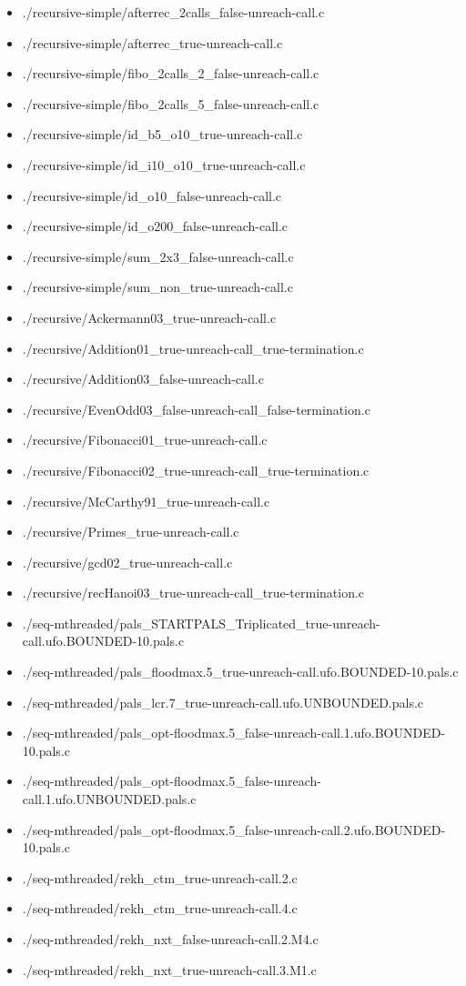 \documentclass[envcountsame]{llncs}
\begin{document}
\begin{itemize}
\item ./recursive-simple/afterrec\_2calls\_false-unreach-call.c
\item ./recursive-simple/afterrec\_true-unreach-call.c
\item ./recursive-simple/fibo\_2calls\_2\_false-unreach-call.c
\item ./recursive-simple/fibo\_2calls\_5\_false-unreach-call.c
\item ./recursive-simple/id\_b5\_o10\_true-unreach-call.c
\item ./recursive-simple/id\_i10\_o10\_true-unreach-call.c
\item ./recursive-simple/id\_o10\_false-unreach-call.c
\item ./recursive-simple/id\_o200\_false-unreach-call.c
\item ./recursive-simple/sum\_2x3\_false-unreach-call.c
\item ./recursive-simple/sum\_non\_true-unreach-call.c


\item ./recursive/Ackermann03\_true-unreach-call.c
\item ./recursive/Addition01\_true-unreach-call\_true-termination.c
\item ./recursive/Addition03\_false-unreach-call.c
\item ./recursive/EvenOdd03\_false-unreach-call\_false-termination.c
\item ./recursive/Fibonacci01\_true-unreach-call.c
\item ./recursive/Fibonacci02\_true-unreach-call\_true-termination.c
\item ./recursive/McCarthy91\_true-unreach-call.c
\item ./recursive/Primes\_true-unreach-call.c
\item ./recursive/gcd02\_true-unreach-call.c
\item ./recursive/recHanoi03\_true-unreach-call\_true-termination.c


\item ./seq-mthreaded/pals\_STARTPALS\_Triplicated\_true-unreach-call.ufo.BOUNDED-10.pals.c
\item ./seq-mthreaded/pals\_floodmax.5\_true-unreach-call.ufo.BOUNDED-10.pals.c
\item ./seq-mthreaded/pals\_lcr.7\_true-unreach-call.ufo.UNBOUNDED.pals.c
\item ./seq-mthreaded/pals\_opt-floodmax.5\_false-unreach-call.1.ufo.BOUNDED-10.pals.c
\item ./seq-mthreaded/pals\_opt-floodmax.5\_false-unreach-call.1.ufo.UNBOUNDED.pals.c
\item ./seq-mthreaded/pals\_opt-floodmax.5\_false-unreach-call.2.ufo.BOUNDED-10.pals.c
\item ./seq-mthreaded/rekh\_ctm\_true-unreach-call.2.c
\item ./seq-mthreaded/rekh\_ctm\_true-unreach-call.4.c
\item ./seq-mthreaded/rekh\_nxt\_false-unreach-call.2.M4.c
\item ./seq-mthreaded/rekh\_nxt\_true-unreach-call.3.M1.c



\end{itemize}
\end{document}

